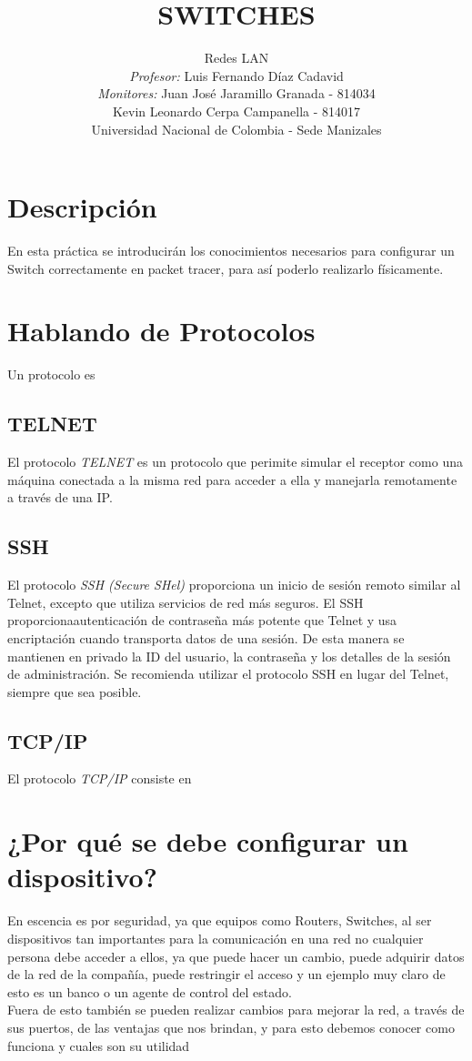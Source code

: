 \documentclass[journal]{IEEEtran}
\title{\textbf{SWITCHES}}
\author{Redes LAN \\
	\textit{Profesor:} Luis Fernando Díaz Cadavid\\ 
	\textit{Monitores:} Juan José Jaramillo Granada - 814034 \\
	Kevin Leonardo Cerpa Campanella - 814017 \\
	Universidad Nacional de Colombia - Sede Manizales}
\date{}
\begin{document}
\maketitle

\section{Descripción}
En esta práctica se introducirán los conocimientos necesarios para configurar un Switch correctamente en packet tracer, para así poderlo realizarlo físicamente.

\section{Hablando de Protocolos}
Un protocolo es
	\subsection{TELNET}
	El protocolo \textit{TELNET} es un protocolo que perimite simular el receptor como una máquina conectada a la misma red para acceder a ella y manejarla remotamente a través de una IP.
	\subsection{SSH}
	El protocolo \textit{SSH (Secure SHel)} proporciona	un inicio de sesión remoto similar al Telnet, excepto que utiliza servicios de red más seguros. El SSH proporcionaautenticación de contraseña más potente que Telnet y usa encriptación cuando transporta datos de una sesión. 	De esta manera se mantienen en privado la ID del usuario, la contraseña y los detalles de la sesión de administración. Se recomienda utilizar el protocolo SSH en lugar del Telnet, siempre que sea posible.
	\subsection{TCP/IP}
	El protocolo \textit{TCP/IP} consiste en

\section{¿Por qué se debe configurar un dispositivo?}
En escencia es por seguridad, ya que equipos como Routers, Switches, al ser dispositivos tan importantes para la comunicación en una red no cualquier persona debe acceder a ellos, ya que puede hacer un cambio, puede adquirir datos de la red de la compañía, puede restringir el acceso y un ejemplo muy claro de esto es un banco o un agente de control del estado. \\
Fuera de esto también se pueden realizar cambios para mejorar la red, a través de sus puertos, de las ventajas que nos brindan, y para esto debemos conocer como funciona y cuales son su utilidad
\end{document}
